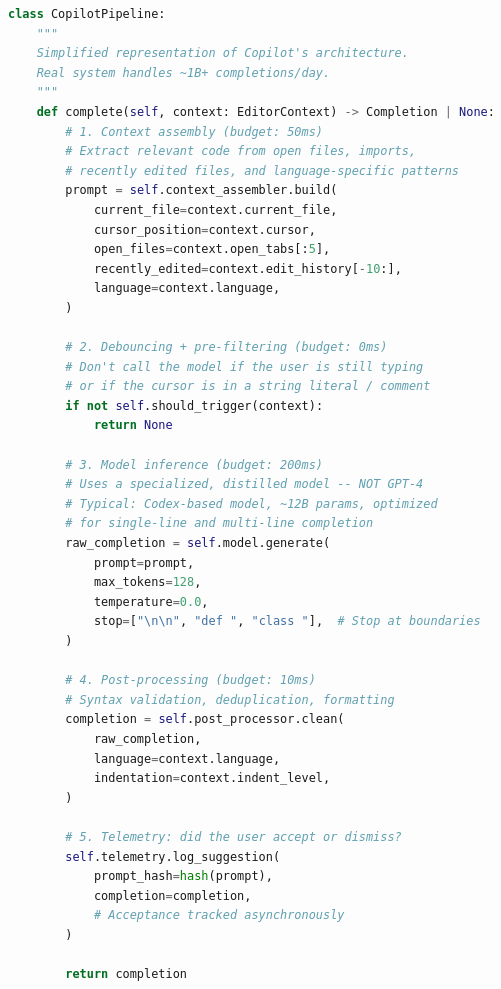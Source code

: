 \begin{lstlisting}[language=Python, caption={Simplified model of Copilot's completion pipeline}]
class CopilotPipeline:
    """
    Simplified representation of Copilot's architecture.
    Real system handles ~1B+ completions/day.
    """
    def complete(self, context: EditorContext) -> Completion | None:
        # 1. Context assembly (budget: 50ms)
        # Extract relevant code from open files, imports,
        # recently edited files, and language-specific patterns
        prompt = self.context_assembler.build(
            current_file=context.current_file,
            cursor_position=context.cursor,
            open_files=context.open_tabs[:5],
            recently_edited=context.edit_history[-10:],
            language=context.language,
        )
        
        # 2. Debouncing + pre-filtering (budget: 0ms)
        # Don't call the model if the user is still typing
        # or if the cursor is in a string literal / comment
        if not self.should_trigger(context):
            return None
        
        # 3. Model inference (budget: 200ms)
        # Uses a specialized, distilled model -- NOT GPT-4
        # Typical: Codex-based model, ~12B params, optimized
        # for single-line and multi-line completion
        raw_completion = self.model.generate(
            prompt=prompt,
            max_tokens=128,
            temperature=0.0,
            stop=["\n\n", "def ", "class "],  # Stop at boundaries
        )
        
        # 4. Post-processing (budget: 10ms)
        # Syntax validation, deduplication, formatting
        completion = self.post_processor.clean(
            raw_completion,
            language=context.language,
            indentation=context.indent_level,
        )
        
        # 5. Telemetry: did the user accept or dismiss?
        self.telemetry.log_suggestion(
            prompt_hash=hash(prompt),
            completion=completion,
            # Acceptance tracked asynchronously
        )
        
        return completion
\end{lstlisting}

